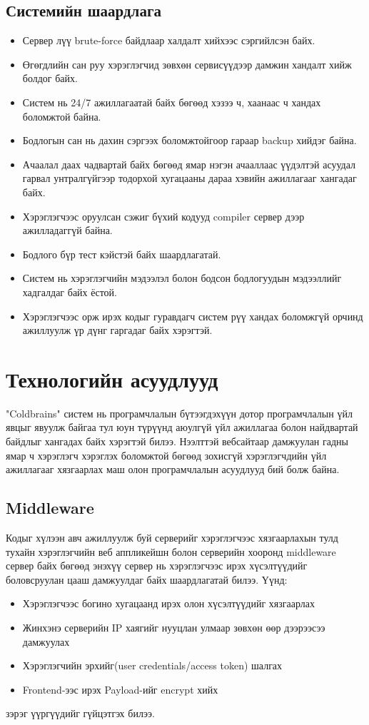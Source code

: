 \subsection{Системийн шаардлага}
\begin{itemize}
  \item Сервер лүү brute-force байдлаар халдалт хийхээс сэргийлсэн байх.
  \item Өгөгдлийн сан руу хэрэглэгчид зөвхөн сервисүүдээр дамжин хандалт хийж болдог байх.
  \item Систем нь 24/7 ажиллагаатай байх бөгөөд хэзээ ч, хаанаас ч хандах боломжтой байна.
  \item  Бодлогын сан нь дахин сэргээх боломжтойгоор гараар backup хийдэг байна.
  \item Ачаалал даах чадвартай байх бөгөөд ямар нэгэн ачааллаас үүдэлтэй асуудал гарвал унтралгүйгээр тодорхой хугацааны дараа хэвийн ажиллагааг хангадаг байх.
  \item Хэрэглэгчээс оруулсан сэжиг бүхий кодууд compiler сервер дээр ажилладаггүй байна.
  \item Бодлого бүр тест кэйстэй байх шаардлагатай.
  \item Систем нь хэрэглэгчийн мэдээлэл болон бодсон бодлогуудын мэдээллийг хадгалдаг байх ёстой.
  \item Хэрэглэгчээс орж ирэх кодыг гуравдагч систем рүү хандах боломжгүй орчинд ажиллуулж үр дүнг гаргадаг байх хэрэгтэй.
\end{itemize}

\clearpage

\section{Технологийн асуудлууд}
"Coldbrains" систем нь програмчлалын бүтээгдэхүүн дотор програмчлалын үйл явцыг явуулж байгаа тул юун түрүүнд аюулгүй үйл ажиллагаа болон найдвартай байдлыг хангадах байх хэрэгтэй билээ. Нээлттэй вебсайтаар дамжуулан гадны ямар ч хэрэглэгч хэрэглэх боломжтой бөгөөд зохисгүй хэрэглэгчдийн үйл ажиллагааг хязгаарлах маш олон програмчлалын асуудлууд бий болж байна.

\subsection{Middleware}
Кодыг хүлээн авч ажиллуулж буй серверийг хэрэглэгчээс хязгаарлахын тулд тухайн хэрэглэгчийн веб аппликейшн болон серверийн хооронд middleware сервер байх бөгөөд энэхүү сервер нь хэрэглэгчээс ирэх хүсэлтүүдийг боловсруулан цааш дамжуулдаг байх шаардлагатай билээ. Үүнд:
\begin{itemize}
  \item Хэрэглэгчээс богино хугацаанд ирэх олон хүсэлтүүдийг хязгаарлах
  \item Жинхэнэ серверийн IP хаягийг нууцлан улмаар зөвхөн өөр дээрээсээ дамжуулах
  \item Хэрэглэгчийн эрхийг(user credentials/access token) шалгах
  \item Frontend-ээс ирэх Payload-ийг encrypt хийх
\end{itemize}
зэрэг үүргүүдийг гүйцэтгэх билээ.

